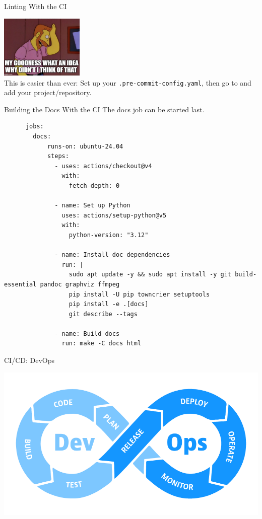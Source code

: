 \begin{darkframe}[fragile]{Linting With the CI}
  \begin{center}
    \includegraphics[height=3cm]{graphics/hank.jpg}\\[0.5\baselineskip]
    \huge\textcolor{ccyan}{%
      This is easier than ever: Set up your \texttt{.pre-commit-config.yaml},
      then go to  and add your project/repository.
    }
  \end{center}
\end{darkframe}

\begin{darkframe}[fragile]{Building the Docs With the CI}
  The docs job can be started last.
  \footnotesize
    \begin{verbatim}
      jobs:
        docs:
            runs-on: ubuntu-24.04
            steps:
              - uses: actions/checkout@v4
                with:
                  fetch-depth: 0

              - name: Set up Python
                uses: actions/setup-python@v5
                with:
                  python-version: "3.12"

              - name: Install doc dependencies
                run: |
                  sudo apt update -y && sudo apt install -y git build-essential pandoc graphviz ffmpeg
                  pip install -U pip towncrier setuptools
                  pip install -e .[docs]
                  git describe --tags

              - name: Build docs
                run: make -C docs html
    \end{verbatim}
\end{darkframe}

\begin{darkframe}{CI/CD: DevOps}
  \begin{center}
    \includegraphics[height=0.6\textheight]{graphics/devops.png}
  \end{center}
\end{darkframe}

